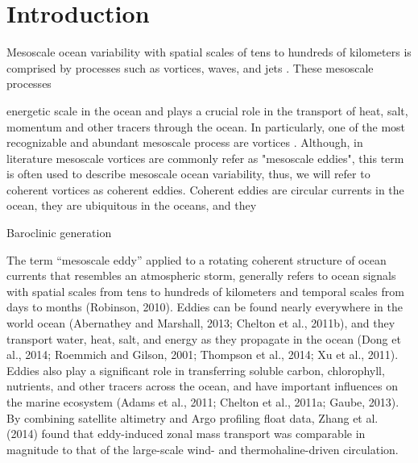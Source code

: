 \documentclass[draft,linenumbers]{agujournal2019}
\begin{document}
	
\section{Introduction}

Mesoscale ocean variability with spatial scales of tens to hundreds of kilometers is comprised by processes such as vortices, waves, and jets \citep{Ferrari_energy_2009, Wyrtki_Eddy_1976}. 
These mesoscale processes  


energetic scale in the ocean and plays a crucial role in the transport of heat, salt, momentum and other tracers through the ocean. In particularly, one of the most recognizable and abundant mesoscale process are vortices \citep{Abernathey_eddy_diffusivity_2013, Chelton_The_2011}.
Although, in literature mesoscale vortices are commonly refer as "mesoscale eddies", this term is often used to describe mesoscale ocean variability, thus, we will refer to coherent vortices as coherent eddies. 
Coherent eddies are circular currents in the ocean, they are ubiquitous in the oceans, and they 



Baroclinic generation \citep{Flierl_baroclinic_1980}


The term “mesoscale eddy” applied to a rotating coherent
structure of ocean currents that resembles an atmospheric storm,
generally refers to ocean signals with spatial scales from tens to
hundreds of kilometers and temporal scales from days to months
(Robinson, 2010). Eddies can be found nearly everywhere in the
world ocean (Abernathey and Marshall, 2013; Chelton et al.,
2011b), and they transport water, heat, salt, and energy as they
propagate in the ocean (Dong et al., 2014; Roemmich and Gilson,
2001; Thompson et al., 2014; Xu et al., 2011). Eddies also play a
significant role in transferring soluble carbon, chlorophyll, nutrients, and other tracers across the ocean, and have important influences on the marine ecosystem (Adams et al., 2011; Chelton et
al., 2011a; Gaube, 2013). By combining satellite altimetry and
Argo profiling float data, Zhang et al. (2014) found that eddy-induced zonal mass transport was comparable in magnitude to
that of the large-scale wind- and thermohaline-driven circulation.
\end{document}
